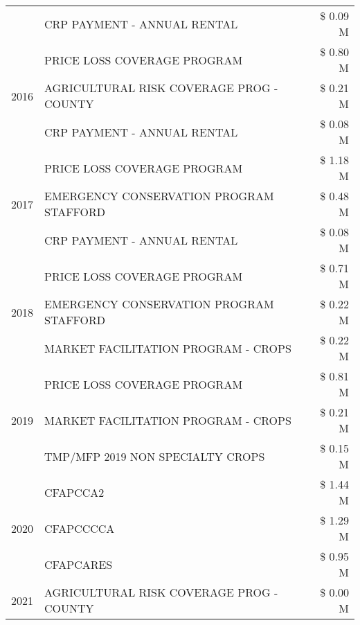 \begin{tabular}{llr}
 & CRP PAYMENT - ANNUAL RENTAL & \$ 0.09 M \\
\cline{1-3}
\multirow[t]{3}{*}{2016} & PRICE LOSS COVERAGE PROGRAM                   & \$ 0.80 M \\
 & AGRICULTURAL RISK COVERAGE PROG - COUNTY      & \$ 0.21 M \\
 & CRP PAYMENT - ANNUAL RENTAL                   & \$ 0.08 M \\
\cline{1-3}
\multirow[t]{3}{*}{2017} & PRICE LOSS COVERAGE PROGRAM & \$ 1.18 M \\
 & EMERGENCY CONSERVATION PROGRAM STAFFORD & \$ 0.48 M \\
 & CRP PAYMENT - ANNUAL RENTAL & \$ 0.08 M \\
\cline{1-3}
\multirow[t]{3}{*}{2018} & PRICE LOSS COVERAGE PROGRAM & \$ 0.71 M \\
 & EMERGENCY CONSERVATION PROGRAM STAFFORD & \$ 0.22 M \\
 & MARKET FACILITATION PROGRAM - CROPS & \$ 0.22 M \\
\cline{1-3}
\multirow[t]{3}{*}{2019} & PRICE LOSS COVERAGE PROGRAM & \$ 0.81 M \\
 & MARKET FACILITATION PROGRAM - CROPS & \$ 0.21 M \\
 & TMP/MFP 2019 NON SPECIALTY CROPS & \$ 0.15 M \\
\cline{1-3}
\multirow[t]{3}{*}{2020} & CFAPCCA2 & \$ 1.44 M \\
 & CFAPCCCCA & \$ 1.29 M \\
 & CFAPCARES & \$ 0.95 M \\
\cline{1-3}
2021 & AGRICULTURAL RISK COVERAGE PROG - COUNTY & \$ 0.00 M \\
\cline{1-3}
\bottomrule
\end{tabular}
